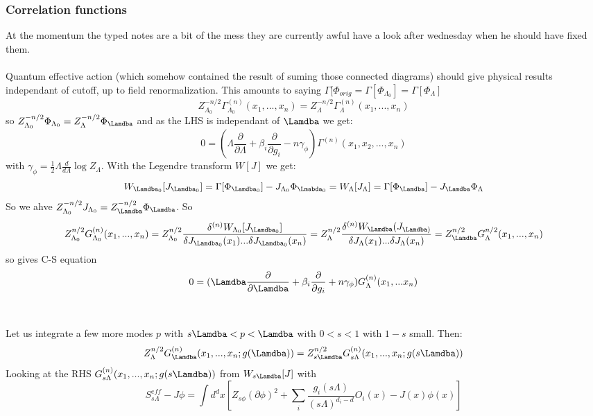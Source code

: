 \documentclass{article}
\begin{document}
\subsubsection{Correlation functions}
At the momentum the typed notes are a bit of the mess they are currently awful have a look after wednesday when he should have fixed them. \\\\
Quantum effective action (which somehow contained the result of suming those connected diagrams) should give physical results independant of cutoff, up to field renormalization. This amounts to saying $\Gamma[\Phi_{orig} = \Gamma[ \Phi_{\Lambda_0}] = \Gamma[ \Phi_{\Lambda}]$ 
$$
Z_{\Lambda_0}^{-n/2} \Gamma^{(n)}_{\Lambda_0} ( x_1,..., x_n) = Z_{\Lambda}^{-n/2} \Gamma_{\Lambda}^{(n)}(x_1,...,x_n)
$$
so $Z_{\Lambda_0}^{-n/2} \Phi_{\Lambda_0} = Z_{\Lambda}^{-n/2} \Phi_{\Lamdba}$ and as the LHS is independant of $\Lamdba$ we get:
$$
0 = ( \Lambda \frac{\partial}{\partial \Lambda} + \beta_i \frac{\partial }{\partial g_i} - n \gamma_{\phi}) \Gamma^{(n)}(x_1, x_2,...,x_n)
$$
with $\gamma_{\phi} = \frac{1}{2} \Lambda \frac{d}{d\Lambda} \log Z_{\Lambda}$. With the Legendre transform $W[J]$ we get:
$$
 W_{\Lamdba_0}[ J_{\Lamdba_0}] = \Gamma[ \Phi_{\Lamdba_0}] - J_{\Lambda_0} \Phi_{\Lmabda_0} = W_{\Lambda}[ J_{\Lambda}] = \Gamma[ \Phi_{\Lamdba}] - J_{\Lamdba} \Phi_{\Lambda}
$$
So we ahve $Z_{\Lambda_0}^{-n/2} J_{\Lambda_0} = Z^{-n/2} _{\Lamdba} \Phi_{\Lamdba}$. So 
$$
Z_{\Lambda_0} ^{n/2} G_{\Lambda_0} ^{(n)} (x_1,...,x_n) = Z_{\Lambda_0}^{n/2} \frac{\delta ^{(n)} W_{\Lambda_0} [ J_{\Lamdba_0}]}{ \delta J_{\Lamdba_0}(x_1)... \delta J_{\Lamdba_0}(x_n)} = Z_{\Lambda} ^{n/2} \frac{\delta^{(n)} W_{\Lamdba} ( J_{\Lamdba)}}{ \delta J_{\Lambda}(x_1)... \delta J_{\Lambda}(x_n)} = Z_{\Lamdba}^{n/2} G_{\Lambda}^{n/2} (x_1,...,x_n)
$$
 so gives C-S equation
 $$
 0 = ( \Lamdba \frac{\partial}{\partial \Lamdba} + \beta_i \frac{\partial}{\partial g_i} + n \gamma_{\phi} ) G_{\Lambda}^{(n)} (x_1,...x_n)
 $$\\\\
 Let us integrate a few more modes $p$ with $s \Lamdba < p < \Lamdba $ with $0< s< 1$ with $1-s$ small. Then:
 $$
  Z_{\Lambda}^{n/2} G_{\Lamdba}^{(n)} (x_1, ..., x_n; g(\Lamdba)) = Z_{s \Lamdba}^{n/2} G_{s\Lambda}^{(n)} ( x_1,...,x_n;g(s\Lamdba))
 $$
 Looking at the RHS $G_{s\Lambda}^{(n)} ( x_1,...,x_n;g(s\Lamdba))$ from $W_{s\Lamdba}[J]$ with $$S^{eff}_{s\Lambda} - J \phi = \int d^d x [ Z_{s\phi} ( \partial \phi)^2 + \sum_i \frac{g_i(s \Lambda)}{(s\Lambda)^{d_i-d}} O_i(x) - J(x) \phi(x)]$$
\end{document}
